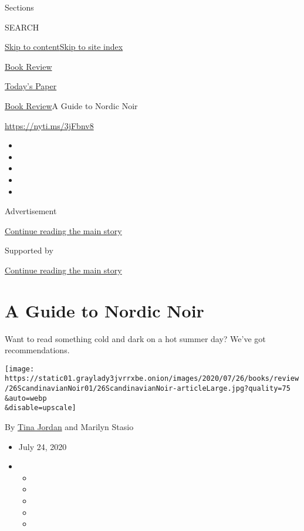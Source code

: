 Sections

SEARCH

\protect\hyperlink{site-content}{Skip to
content}\protect\hyperlink{site-index}{Skip to site index}

\href{https://www.nytimes3xbfgragh.onion/section/books/review}{Book
Review}

\href{https://myaccount.nytimes3xbfgragh.onion/auth/login?response_type=cookie\&client_id=vi}{}

\href{https://www.nytimes3xbfgragh.onion/section/todayspaper}{Today's
Paper}

\href{/section/books/review}{Book Review}\textbar{}A Guide to Nordic
Noir

\url{https://nyti.ms/3jFbnv8}

\begin{itemize}
\item
\item
\item
\item
\item
\end{itemize}

Advertisement

\protect\hyperlink{after-top}{Continue reading the main story}

Supported by

\protect\hyperlink{after-sponsor}{Continue reading the main story}

\hypertarget{a-guide-to-nordic-noir}{%
\section{A Guide to Nordic Noir}\label{a-guide-to-nordic-noir}}

Want to read something cold and dark on a hot summer day? We've got
recommendations.

\texttt{[image: https://static01.graylady3jvrrxbe.onion/images/2020/07/26/books/review/26ScandinavianNoir01/26ScandinavianNoir-articleLarge.jpg?quality=75\\\&auto=webp\\\&disable=upscale]}

By \href{https://www.nytimes3xbfgragh.onion/by/tina-jordan}{Tina Jordan}
and Marilyn Stasio

\begin{itemize}
\item
  July 24, 2020
\item
  \begin{itemize}
  \item
  \item
  \item
  \item
  \item
  \end{itemize}
\end{itemize}

